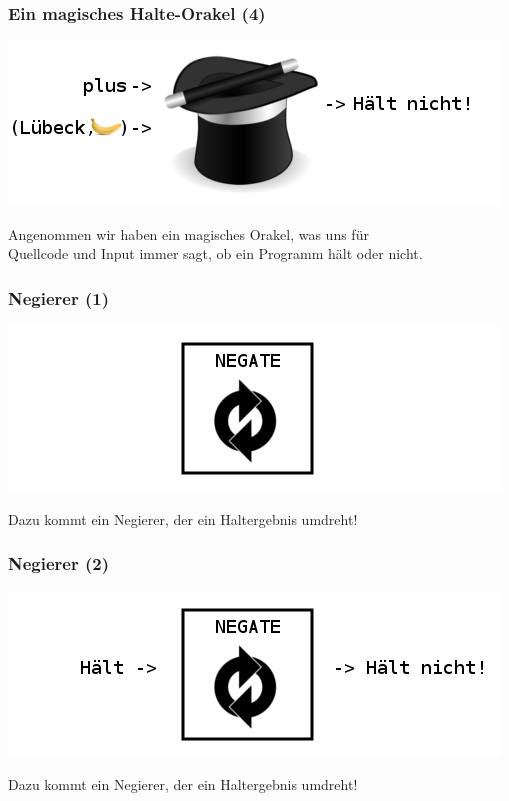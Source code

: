 \documentclass[aspectratio=169]{beamer}
\begin{document}

\begin{frame}
\frametitle{Ein magisches Halte-Orakel (4)}
\begin{center}
\includegraphics[scale=1.4]{images/erklaerung03.png}
\bigskip

Angenommen wir haben ein magisches Orakel, was uns für\\Quellcode und Input immer sagt, ob ein Programm hält oder nicht. 
\end{center}
\end{frame}


\begin{frame}
\frametitle{Negierer (1)}
\begin{center}
\includegraphics[scale=1.4]{images/erklaerung04.png} 
\bigskip

Dazu kommt ein Negierer, der ein Haltergebnis umdreht!
\end{center}
\end{frame}


\begin{frame}
\frametitle{Negierer (2)}
\begin{center}
\includegraphics[scale=1.4]{images/erklaerung05.png}
\bigskip

Dazu kommt ein Negierer, der ein Haltergebnis umdreht!
\end{center}
\end{frame}
\end{document}
